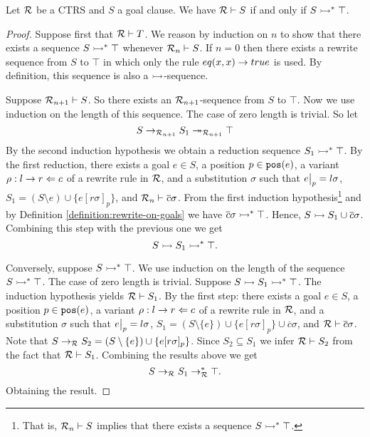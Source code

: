 \begin{lemma}\label{lemma:completeness-rewrite-on-goals}
	Let $\mathcal{R}$ be a CTRS and $S$ a goal clause. We have $\mathcal{R} \vdash S$ if and only if $S \rightarrowtail^* \top$.

	\begin{proof}
		Suppose first that $\mathcal{R} \vdash T$. We reason by induction on $n$ to show that there exists a sequence $S \rightarrowtail^* \top$ whenever $\mathcal{R}_n \vdash S$. If $n = 0$ then there exists a rewrite sequence from $S$ to $\top$ in which only the rule $eq(x,x) \rightarrow true$ is used. By definition, this sequence is also a $\rightarrowtail$-sequence.

		Suppose $\mathcal{R}_{n+1} \vdash S$. So there exists an $\mathcal{R}_{n+1}$-sequence from $S$ to $\top$. Now we use induction on the length of this sequence. The case of zero length is trivial. So let
		$$S \rightarrow_{\mathcal{R}_{n+1}} S_1 \twoheadrightarrow_{\mathcal{R}_{n+1}} \top$$
		By the second induction hypothesis we obtain a reduction sequence $S_1 \rightarrowtail^* \top$. By the first reduction, there exists a goal $e \in S$, a position $p \in \mathtt{pos}(e)$, a variant $ \rho : l \rightarrow r \Leftarrow c$ of a rewrite rule in $\mathcal{R}$, and a substitution $\sigma$ such that $\restr{e}{p} = l \sigma$, $S_1 = (S \setminus{e}) \cup \{e[r\sigma]_p\}$, and $\mathcal{R}_n \vdash \overline{c}\sigma$.  From the first induction hypothesis\footnote{That is, $\mathcal{R}_n \vdash S$ implies that there exists a sequence $S \rightarrowtail^* \top$.}
		and by Definition \ref{definition:rewrite-on-goals} we have $\overline{c}\sigma \rightarrowtail^* \top$. Hence, $S \rightarrowtail S_1 \cup \overline{c}\sigma$. Combining this step with the previous one we get
		$$S \rightarrowtail S_1 \rightarrowtail^* \top.$$

		Conversely, suppose $S \rightarrowtail^* \top$. We use induction on the length of the sequence $S \rightarrowtail^* \top$. The case of zero length is trivial. Suppose $S \rightarrowtail S_1 \rightarrowtail^* \top$. The induction hypothesis yields $\mathcal{R} \vdash S_1$. By the first step: there exists a goal $e \in S$, a position $p \in \mathtt{pos}(e)$, a variant $\rho: l \rightarrow r \Leftarrow c$ of a rewrite rule in $\mathcal{R}$, and a substitution $\sigma$ such that $\restr{e}{p} = l \sigma$, $S_1 = (S \setminus \{e\}) \cup \{e[r\sigma]_p\} \cup \overline{c}\sigma$, and $ \mathcal{R} \vdash \overline{c}\sigma$. Note that $S \rightarrow_{\mathcal{R}} S_2 = (S \setminus \{e\}) \cup \{e[r\sigma]_p\}$. Since $S_2 \subseteq S_1$ we infer $\mathcal{R} \vdash S_2$ from the fact that $\mathcal{R} \vdash S_1$. Combining the results above we get
		$$S \rightarrow_{\mathcal{R}} S_1 \rightarrow_{\mathcal{R}}^* \top.$$
		Obtaining the result.
	\end{proof}
\end{lemma}

